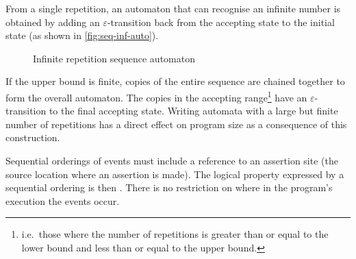 From a single repetition, an automaton that can recognise an infinite
number is obtained by adding an $\varepsilon$-transition back from the
accepting state to the initial state (as shown in
\autoref{fig:seq-inf-auto}).

\begin{figure}
  \centering
  \caption{Infinite repetition sequence automaton}
  \label{fig:seq-inf-auto}
\end{figure}

If the upper bound is finite, copies of the entire sequence are chained
together to form the overall automaton. The copies in the accepting
range\footnote{i.e.\ those where the number of repetitions is greater
than or equal to the lower bound and less than or equal to the upper
bound.} have an $\varepsilon$-transition to the final accepting state.
Writing automata with a large but finite number of repetitions has a
direct effect on program size as a consequence of this construction.

Sequential orderings of events must include a reference to an assertion
site (the source location where an assertion is made). The logical
property expressed by a sequential ordering is then . There is no restriction on
where in the program's execution the events occur.

